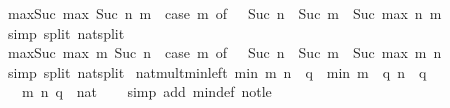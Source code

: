 \begin{isabellebody}
%
\isadelimproof
\isanewline
%
\endisadelimproof
\isanewline
{}\isamarkupfalse%
\ max{\isacharunderscore}{\kern0pt}Suc{}{\isacharcolon}{\kern0pt}\ {\isachardoublequoteopen}max\ {\isacharparenleft}{\kern0pt}Suc\ n{\isacharparenright}{\kern0pt}\ m\ {\isacharequal}{\kern0pt}\ {\isacharparenleft}{\kern0pt}case\ m\ of\ {}\ {\isasymRightarrow}\ Suc\ n\ {\isacharbar}{\kern0pt}\ Suc\ m{\isacharprime}{\kern0pt}\ {\isasymRightarrow}\ Suc\ {\isacharparenleft}{\kern0pt}max\ n\ m{\isacharprime}{\kern0pt}{\isacharparenright}{\kern0pt}{\isacharparenright}{\kern0pt}{\isachardoublequoteclose}\isanewline
%
\isadelimproof
\ \ %
\endisadelimproof
%
\isatagproof
{}\isamarkupfalse%
\ {\isacharparenleft}{\kern0pt}simp\ split{\isacharcolon}{\kern0pt}\ nat{\isachardot}{\kern0pt}split{\isacharparenright}{\kern0pt}%
\endisatagproof
{\isafoldproof}%
%
\isadelimproof
\isanewline
%
\endisadelimproof
\isanewline
{}\isamarkupfalse%
\ max{\isacharunderscore}{\kern0pt}Suc{}{\isacharcolon}{\kern0pt}\ {\isachardoublequoteopen}max\ m\ {\isacharparenleft}{\kern0pt}Suc\ n{\isacharparenright}{\kern0pt}\ {\isacharequal}{\kern0pt}\ {\isacharparenleft}{\kern0pt}case\ m\ of\ {}\ {\isasymRightarrow}\ Suc\ n\ {\isacharbar}{\kern0pt}\ Suc\ m{\isacharprime}{\kern0pt}\ {\isasymRightarrow}\ Suc\ {\isacharparenleft}{\kern0pt}max\ m{\isacharprime}{\kern0pt}\ n{\isacharparenright}{\kern0pt}{\isacharparenright}{\kern0pt}{\isachardoublequoteclose}\isanewline
%
\isadelimproof
\ \ %
\endisadelimproof
%
\isatagproof
{}\isamarkupfalse%
\ {\isacharparenleft}{\kern0pt}simp\ split{\isacharcolon}{\kern0pt}\ nat{\isachardot}{\kern0pt}split{\isacharparenright}{\kern0pt}%
\endisatagproof
{\isafoldproof}%
%
\isadelimproof
\isanewline
%
\endisadelimproof
\isanewline
{}\isamarkupfalse%
\ nat{\isacharunderscore}{\kern0pt}mult{\isacharunderscore}{\kern0pt}min{\isacharunderscore}{\kern0pt}left{\isacharcolon}{\kern0pt}\ {\isachardoublequoteopen}min\ m\ n\ {\isacharasterisk}{\kern0pt}\ q\ {\isacharequal}{\kern0pt}\ min\ {\isacharparenleft}{\kern0pt}m\ {\isacharasterisk}{\kern0pt}\ q{\isacharparenright}{\kern0pt}\ {\isacharparenleft}{\kern0pt}n\ {\isacharasterisk}{\kern0pt}\ q{\isacharparenright}{\kern0pt}{\isachardoublequoteclose}\isanewline
\ \ \ m\ n\ q\ {\isacharcolon}{\kern0pt}{\isacharcolon}{\kern0pt}\ nat\isanewline
%
\isadelimproof
\ \ %
\endisadelimproof
%
\isatagproof
{}\isamarkupfalse%
\ {\isacharparenleft}{\kern0pt}simp\ add{\isacharcolon}{\kern0pt}\ min{\isacharunderscore}{\kern0pt}def\ not{\isacharunderscore}{\kern0pt}le{\isacharparenright}{\kern0pt}\isanewline

\end{isabellebody}
